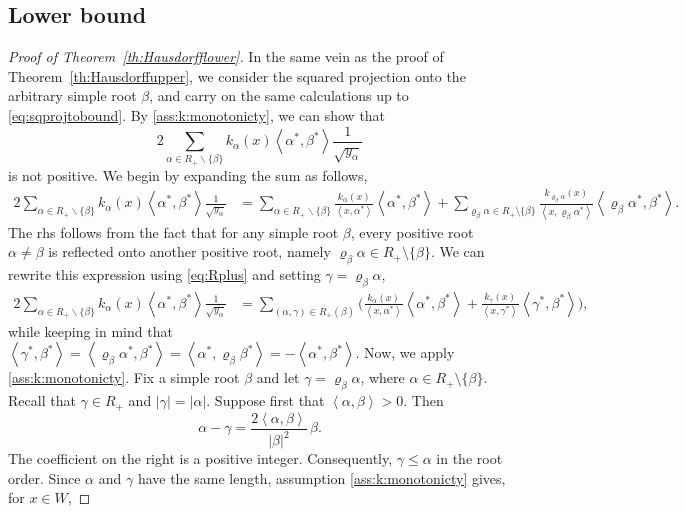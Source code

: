 \documentclass{article}
\numberwithin{equation}{section}
\newcommand{\inner}[2]{\left<#1,#2\right>}
\newcommand{\C}{W}
\newcommand{\xas}{\left<x,\alpha^*\right>}
\newcommand{\aR}{\alpha\in R_+}
\newcommand{\SaRnb}{\sum_{\aR\backslash\{\beta\}}}
\newcommand{\reflect}[1]{\varrho_{#1}}
\theoremstyle{plain}
\begin{document}
\subsection{Lower bound}\label{sec:lowerbound}
    \begin{proof}[Proof of Theorem~\ref{th:Hausdorfflower}]
        In the same vein as the proof of 
        Theorem~\ref{th:Hausdorffupper}, we consider the squared projection onto the arbitrary simple root $\beta$, and carry on the same calculations up to \eqref{eq:sqprojtobound}.
        By \ref{ass:k:monotonicty}, we can show that 
        \[2\SaRnb k_\alpha(x)\inner{\alpha^*}{\beta^*}\frac{1}{\sqrt{y_\alpha}}\]
        is not positive. We begin by expanding the sum as follows,
        \begin{align*}
            2\SaRnb k_\alpha(x)\inner{\alpha^*}{\beta^*}\frac{1}{\sqrt{y_\alpha}}&=\SaRnb \frac{k_\alpha(x)}{\xas}\inner{\alpha^*}{\beta^*}+\sum_{\reflect{\beta}\alpha\in R_+\setminus \{\beta\}} \frac{k_{\reflect{\beta}\alpha}(x)}{\inner{x}{\reflect{\beta}\alpha^*}}\inner{\reflect{\beta}\alpha^*}{\beta^*}.
        \end{align*}
        The rhs follows from the fact that for any simple root $\beta$, every positive root $\alpha\neq\beta$ is reflected onto another positive root, namely $\reflect{\beta}\alpha\in R_+\setminus\{\beta\}$. 
        We can rewrite this expression using \eqref{eq:Rplus} and setting $\gamma=\reflect{\beta}\alpha$,
        \begin{align*}
            2\SaRnb k_\alpha(x)\inner{\alpha^*}{\beta^*}\frac{1}{\sqrt{y_\alpha}}&=\sum_{(\alpha,\gamma)\in R_+(\beta)}\Big( \frac{k_\alpha(x)}{\xas}\inner{\alpha^*}{\beta^*}+ \frac{k_{\gamma}(x)}{\inner{x}{\gamma^*}}\inner{\gamma^*}{\beta^*}\Big),
        \end{align*}
        while keeping in mind that $\inner{\gamma^*}{\beta^*}=\inner{\reflect{\beta}\alpha^*}{\beta^*}=\inner{\alpha^*}{\reflect{\beta}\beta^*}=-\inner{\alpha^*}{\beta^*}$.
        Now, we apply \ref{ass:k:monotonicty}. Fix a simple root $\beta$ and let $\gamma=\reflect{\beta}\alpha$, where $\alpha\in R_+\setminus\{\beta\}$. Recall that $\gamma\in R_+$ and $|\gamma|=|\alpha|$. Suppose first that $\inner{\alpha}{\beta}>0$. Then
            \begin{equation*}
                \alpha-\gamma =\frac{2\inner{\alpha}{\beta}}{|\beta|^2}\,\beta.
            \end{equation*}
        The coefficient on the right is a positive integer. Consequently, $\gamma\leq\alpha$ in the root order. Since $\alpha$ and $\gamma$ have the same length, assumption \ref{ass:k:monotonicty} gives, for $x\in\C$,

\end{proof}
\end{document}
